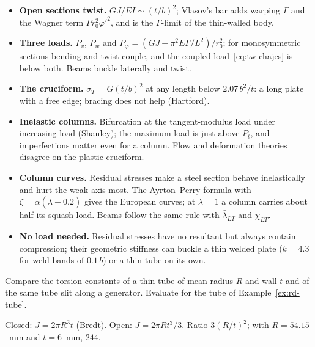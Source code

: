 \begin{gbox*}
\begin{itemize}
  \item \textbf{Open sections twist.} $GJ/EI \sim (t/b)^2$; Vlasov's bar adds warping $\Gamma$ and the Wagner term
        $Pr_0^2\varphi'^2$, and is the $\Gamma$-limit of the thin-walled body.
  \item \textbf{Three loads.} $P_v$, $P_w$ and $P_\varphi = (GJ + \pi^2E\Gamma/L^2)/r_0^2$; for monosymmetric sections bending and
        twist couple, and the coupled load~\eqref{eq:tw-chajes} is below both. Beams buckle laterally and twist.
  \item \textbf{The cruciform.} $\sigma_T = G(t/b)^2$ at any length below $2.07\,b^2/t$: a long plate with a free edge;
        bracing does not help (Hartford).
  \item \textbf{Inelastic columns.} Bifurcation at the tangent-modulus load under increasing load (Shanley);
        the maximum load is just above $P_t$, and imperfections matter even for a column. Flow and deformation
        theories disagree on the plastic cruciform.
  \item \textbf{Column curves.} Residual stresses make a steel section behave inelastically and hurt the weak
        axis most. The Ayrton--Perry formula with $\zeta = \alpha(\bar\lambda - 0.2)$ gives the European curves; at $\bar\lambda = 1$
        a column carries about half its squash load. Beams follow the same rule with $\bar\lambda_{LT}$ and $\chi_{LT}$.
  \item \textbf{No load needed.} Residual stresses have no resultant but always contain compression; their geometric
        stiffness can buckle a thin welded plate ($k = 4.3$ for weld bands of $0.1\,b$) or a thin tube on its own.
\end{itemize}
\end{gbox*}

\label{sec:tw-exo}

\label{exo:tw-tube}
%
Compare the torsion constants of a thin tube of mean radius $R$ and wall $t$ and of the same tube slit
along a generator. Evaluate for the tube of Example~\ref{ex:rd-tube}.
\begin{solution}
Closed: $J = 2\pi R^3t$ (Bredt). Open: $J = 2\pi Rt^3/3$. Ratio $3(R/t)^2$; with $R = 54.15$~mm and $t = 6$~mm, $244$.
\end{solution}

